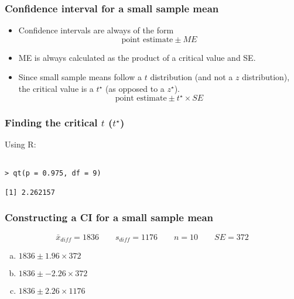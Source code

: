 \documentclass[slidestop,compress,mathserif]{beamer}
\newcommand{\soln}[1]{\textit{#1}}
\begin{document}
\begin{frame}
\frametitle{Confidence interval for a small sample mean}

\begin{itemize}

\item Confidence intervals are always of the form
\[ \text{point estimate} \pm {ME} \]

\pause

\item ME is always calculated as the product of a critical value and SE.

\pause

\item Since small sample means follow a $t$ distribution (and not a $z$ distribution), the critical value is a $t^\star$ (as opposed to a $z^\star$).
\[ \text{point estimate} \pm t^{\star} \times SE \]

\end{itemize}

\end{frame}


\begin{frame}[fragile]
\frametitle{Finding the critical $t$ ($t^\star$)}


Using R:
\begin{verbatim}

> qt(p = 0.975, df = 9)

[1] 2.262157

\end{verbatim}

\end{frame}


\begin{frame}
\frametitle{Constructing a CI for a small sample mean}

\[ \bar{x}_{diff} = 1836 \qquad s_{diff} = 1176 \qquad n = 10 \qquad SE = 372 \]

{
\begin{enumerate}[(a)]

\item $1836 \pm 1.96 \times 372$


\item $1836 \pm -2.26 \times 372$

\item $1836 \pm 2.26 \times 1176$

\end{enumerate}
}
{
\soln{}
\vspace{0.25cm}
}

\end{frame}
\end{document}

